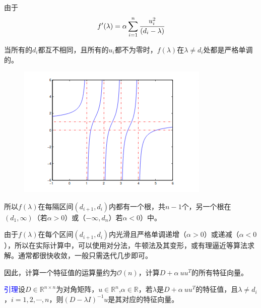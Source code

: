\documentclass[notheorems,serif]{beamer}
\begin{document}
\begin{frame}
由于$$f'(\lambda)=\alpha \sum_{i=1}^{n}\cfrac{u_i^2}{(d_i-\lambda)}$$

当所有的$d_i$都互不相同，且所有的$u_i$都不为零时，$f(\lambda)$在$\lambda \neq d_i$处都是严格单调的。
\begin{figure}[H]
	\centering
	\includegraphics[scale=0.6]{figures/5-4.png}
\end{figure}
\end{frame}
\begin{frame}
所以$f(\lambda)$在每隔区间$(d_{i+1},d_i)$内都有一个根，共$n-1$个，另一个根在$(d_1,\infty)$（若$\alpha >0$）或（$-\infty,d_n$）若$\alpha <0$）中。

由于$f(\lambda)$在每个区间$(d_{i+1},d_i)$内光滑且严格单调递增（$\alpha >0$）或递减（$\alpha <0$），所以在实际计算中，可以使用对分法，牛顿法及其变形，或有理逼近等算法求解。通常都很快收敛，一般只需迭代几步即可。

因此，计算一个特征值的运算量约为$\mathcal{O}(n)$，计算$D+\alpha\ uu^T$的所有特征向量。

\textcolor{blue}{引理}\quad 设$D\in \mathbb R^{n\times n}$为对角矩阵，$u\in \mathbb R^n$,$\alpha \in \mathbb R$，若$\lambda$是$D+\alpha\ uu^T$的特征值，且$\lambda \neq d_i$，$i=1,2,\cdots ,n$，则$(D-\lambda I)^{-1}u$是其对应的特征向量。\\
\end{frame}
\end{document}
